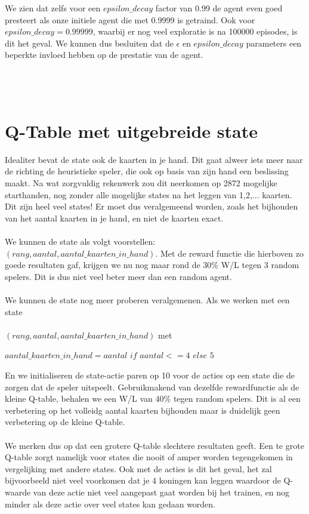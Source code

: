 \documentclass[11pt]{article}
\begin{document}
\noindent We zien dat zelfs voor een $epsilon\_decay$ factor van 0.99 de agent even goed presteert als onze initiele agent die met 0.9999 is getraind. Ook voor $epsilon\_decay = 0.99999$, waarbij er nog veel exploratie is na 100000 episodes, is dit het geval. We kunnen dus besluiten dat de $\epsilon$ en $epsilon\_decay$ parameters een beperkte invloed hebben op de prestatie van de agent.\\\\

\section{\\Q-Table met uitgebreide state}
\label{appendix:extended_state}
Idealiter bevat de state ook de kaarten in je hand. Dit gaat alweer iets meer naar de richting de heuristieke speler, die ook op basis van zijn hand een beslissing maakt. Na wat zorgvuldig rekenwerk zou dit neerkomen op 2872 mogelijke starthanden, nog zonder alle mogelijke states na het leggen van 1,2,... kaarten. Dit zijn heel veel states! Er moet dus veralgemeend worden, zoals het bijhouden van het aantal kaarten in je hand, en niet de kaarten exact.\\\\
We kunnen de state als volgt voorstellen: $(rang, aantal, aantal\_kaarten\_in\_hand)$. Met de reward functie die hierboven zo goede resultaten gaf, krijgen we nu nog maar rond de 30\% W/L tegen 3 random spelers. Dit is dus niet veel beter meer dan een random agent.\\\\
We kunnen de state nog meer proberen veralgemenen. Als we werken met een state\\\\
\indent $(rang, aantal, aantal\_kaarten\_in\_hand)$ met
\begin{center}
$aantal\_kaarten\_in\_hand = aantal$ $if$ $ aantal <= 4$ $else$ $5$
\end{center}
En we initialiseren de state-actie paren op 10 voor de acties op een state die de zorgen dat de speler uitspeelt. Gebruikmakend van dezelfde rewardfunctie als de kleine Q-table, behalen we een W/L van 40\% tegen random spelers. Dit is al een verbetering op het volleidg aantal kaarten bijhouden maar is duidelijk geen verbetering op de kleine Q-table.\\\\
We merken dus op dat een grotere Q-table slechtere resultaten geeft. Een te grote Q-table zorgt namelijk voor states die nooit of amper worden tegengekomen in vergelijking met andere states. Ook met de acties is dit het geval, het zal bijvoorbeeld niet veel voorkomen dat je 4 koningen kan leggen waardoor de Q-waarde van deze actie niet veel aangepast gaat worden bij het trainen, en nog minder als deze actie over veel states kan gedaan worden. \\\\
\end{document}
